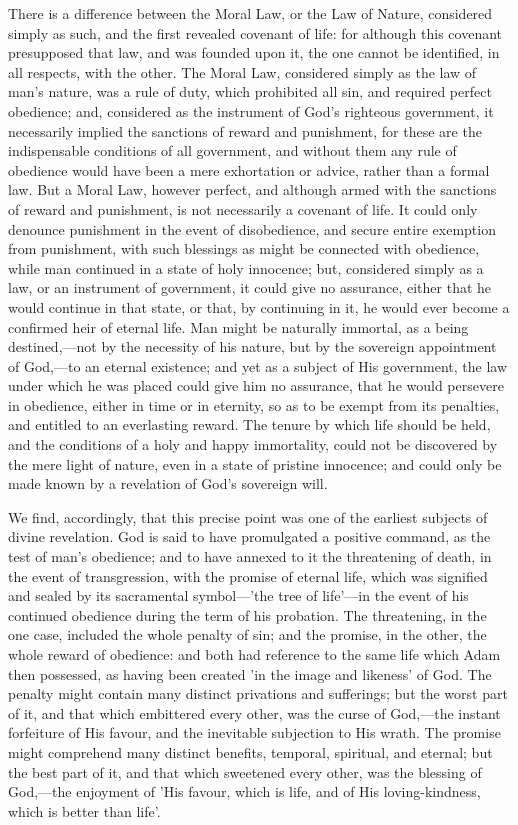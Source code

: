 \documentclass[
]{book}
\begin{document}
There is a difference between the Moral Law, or the Law of Nature, considered simply as such, and the first revealed covenant of life: for although this covenant presupposed that law, and was founded upon it, the one cannot be identified, in all respects, with the other. The Moral Law, considered simply as the law of man's nature, was a rule of duty, which prohibited all sin, and required perfect obedience; and, considered as the instrument of God's righteous government, it necessarily implied the sanctions of reward and punishment, for these are the indispensable conditions of all government, and without them any rule of obedience would have been a mere exhortation or advice, rather than a formal law. But a Moral Law, however perfect, and although armed with the sanctions of reward and punishment, is not necessarily a covenant of life. It could only denounce punishment in the event of disobedience, and secure entire exemption from punishment, with such blessings as might be connected with obedience, while man continued in a state of holy innocence; but, considered simply as a law, or an instrument of government, it could give no assurance, either that he would continue in that state, or that, by continuing in it, he would ever become a confirmed heir of eternal life. Man might be naturally immortal, as a being destined,---not by the necessity of his nature, but by the sovereign appointment of God,---to an eternal existence; and yet as a subject of His government, the law under which he was placed could give him no assurance, that he would persevere in obedience, either in time or in eternity, so as to be exempt from its penalties, and entitled to an everlasting reward. The tenure by which life should be held, and the conditions of a holy and happy immortality, could not be discovered by the mere light of nature, even in a state of pristine innocence; and could only be made known by a revelation of God's sovereign will.

We find, accordingly, that this precise point was one of the earliest subjects of divine revelation. God is said to have promulgated a positive command, as the test of man's obedience; and to have annexed to it the threatening of death, in the event of transgression, with the promise of eternal life, which was signified and sealed by its sacramental symbol---'the tree of life'---in the event of his continued obedience during the term of his probation. The threatening, in the one case, included the whole penalty of sin; and the promise, in the other, the whole reward of obedience: and both had reference to the same life which Adam then possessed, as having been created 'in the image and likeness' of God. The penalty might contain many distinct privations and sufferings; but the worst part of it, and that which embittered every other, was the curse of God,---the instant forfeiture of His favour, and the inevitable subjection to His wrath. The promise might comprehend many distinct benefits, temporal, spiritual, and eternal; but the best part of it, and that which sweetened every other, was the blessing of God,---the enjoyment of 'His favour, which is life, and of His loving-kindness, which is better than life'.
\end{document}
